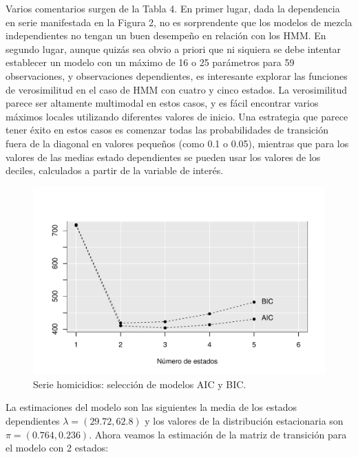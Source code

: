\documentclass[a4paper]{article}\usepackage[]{graphicx}\usepackage[]{color}
\makeatletter
\def\maxwidth{ %
  \ifdim\Gin@nat@width>\linewidth
    \linewidth
  \else
    \Gin@nat@width
  \fi
}
\newenvironment{knitrout}{}{} %
\makeatother
\begin{document}
Varios comentarios surgen de la Tabla 4. En primer lugar, dada la dependencia en serie manifestada en la Figura 2, no es sorprendente que los modelos de mezcla independientes no tengan un buen desempeño en relación con los HMM. En segundo lugar, aunque quizás sea obvio a priori que ni siquiera se debe intentar establecer un modelo con un máximo de 16 o 25 parámetros para 59 observaciones, y observaciones dependientes, es interesante explorar las funciones de verosimilitud en el caso de HMM con cuatro y cinco estados. La verosimilitud parece ser altamente multimodal en estos casos, y es fácil encontrar varios máximos locales utilizando diferentes valores de inicio. Una estrategia que parece tener éxito en estos casos es comenzar todas las probabilidades de transición fuera de la diagonal en valores pequeños (como 0.1 o 0.05), mientras que para los valores de las medias estado dependientes se pueden usar los valores de los deciles, calculados a partir de la variable de interés.

\begin{knitrout}
\color{fgcolor}\begin{figure}[t]
\includegraphics[width=\maxwidth]{figure/unnamed-chunk-12-1} \caption[Serie homicidios]{Serie homicidios: selección de modelos AIC y BIC.}\label{fig:unnamed-chunk-12}
\end{figure}


\end{knitrout}



La estimaciones del modelo son las siguientes la media de los estados dependientes $\lambda = (29.72, 62.8)$  y los valores de la distribución estacionaria son $\pi = (0.764, 0.236)$. Ahora veamos la estimación de la matriz de transición para el modelo con 2 estados:
\end{document}
